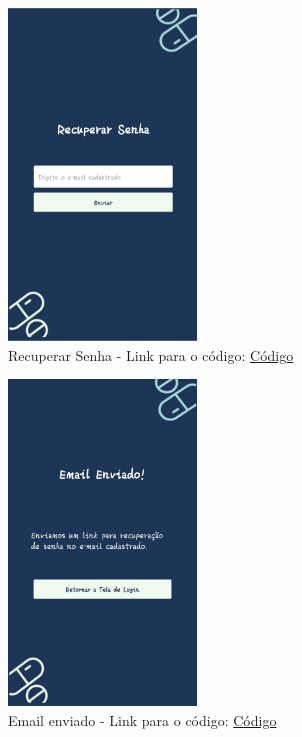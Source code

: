 \begin{apendicesenv}
\begin{figure}[H]
    \centering
    \includegraphics[width=5cm]{figuras/Software_Telas_Frontend/front_RecuperarSenha.jpg}
    \caption{Recuperar Senha - Link para o código: \href{https://github.com/PillWatcher/pillwatcher-dpf-service/blob/dev/components/recuperarSenha.js}{Código}}
    \label{fig:recuperar_senha}
\end{figure}

\begin{figure}[H]
    \centering
    \includegraphics[width=5cm]{figuras/Software_Telas_Frontend/front_EnviarEmail.jpg}
    \caption{Email enviado - Link para o código: \href{https://github.com/PillWatcher/pillwatcher-dpf-service/blob/dev/components/enviarEmail.js}{Código}}
    \label{fig:email_enviado}
\end{figure}


\end{apendicesenv}
